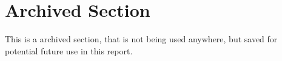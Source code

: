 \section*{Archived Section}
This is a archived section, that is not being used anywhere, but saved for potential future use in this report.